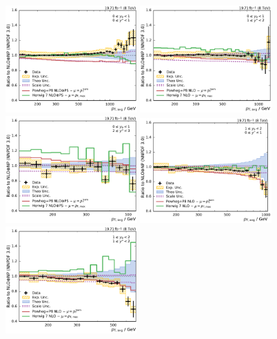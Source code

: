 \begin{figure}[htbp]
    \centering
    \includegraphics[width=0.45\textwidth]{figures/measurement/ratio_to_NNPDF30+np_varcomp_yb0ys0.pdf}\hfill
    \includegraphics[width=0.45\textwidth]{figures/measurement/ratio_to_NNPDF30+np_varcomp_yb0ys1.pdf}
    \includegraphics[width=0.45\textwidth]{figures/measurement/ratio_to_NNPDF30+np_varcomp_yb0ys2.pdf}\hfill
    \includegraphics[width=0.45\textwidth]{figures/measurement/ratio_to_NNPDF30+np_varcomp_yb1ys0.pdf}
    \includegraphics[width=0.45\textwidth]{figures/measurement/ratio_to_NNPDF30+np_varcomp_yb1ys1.pdf}\hfill

\end{figure}
